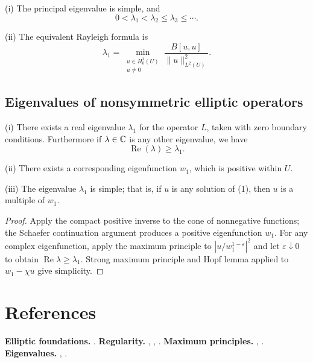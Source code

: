 \begin{remark}
\label{rem:principal-eigenvalue-simple-rayleigh}

(i) The principal eigenvalue is simple, and
$$0 < \lambda_1 < \lambda_2 \leq \lambda_3 \leq \cdots.$$

(ii) The equivalent Rayleigh formula is
$$\lambda_1 = \min_{\substack{u \in H_0^1(U) \\ u \neq 0}} \frac{B[u,u]}{\|u\|_{L^2(U)}^2}.$$
\end{remark}

\subsection{Eigenvalues of nonsymmetric elliptic operators}

\begin{theorem}
\label{thm:principal-eigenvalue-nonsymmetric-operator}

(i) There exists a real eigenvalue $\lambda_1$ for the operator $L$, taken with zero boundary conditions. Furthermore if $\lambda \in \mathbb{C}$ is any other eigenvalue, we have
$$\operatorname{Re}(\lambda) \geq \lambda_1.$$

(ii) There exists a corresponding eigenfunction $w_1$, which is positive within $U$.

(iii) The eigenvalue $\lambda_1$ is simple; that is, if $u$ is any solution of (1), then $u$ is a multiple of $w_1$.
\end{theorem}

\begin{proof}
\sketch Apply the compact positive inverse to the cone of nonnegative functions; the Schaefer continuation argument produces a positive eigenfunction $w_1$. For any complex eigenfunction, apply the maximum principle to $|u/w_1^{1-\varepsilon}|^2$ and let $\varepsilon\downarrow0$ to obtain $\operatorname{Re}\lambda\ge\lambda_1$. Strong maximum principle and Hopf lemma applied to $w_1-\chi u$ give simplicity.
\end{proof}

\section{References}
\label{sec:elliptic-references}
\textbf{Elliptic foundations.} \cite{GilbargTrudinger1983}.
\textbf{Regularity.} \cite{GilbargTrudinger1983}, \cite{Krylov1996}, \cite{LadyzhenskayaUraltseva1968}.
\textbf{Maximum principles.} \cite{GilbargTrudinger1983}, \cite{ProtterWeinberger1967}.
\textbf{Eigenvalues.} \cite{Smoller1983}, \cite{ProtterWeinberger1967}.
